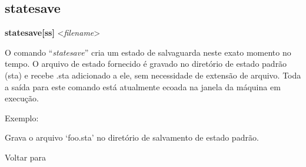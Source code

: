 \documentclass[letterpaper,10pt,brazil]{sphinxmanual}
\begin{document}
\subsection{statesave}
\label{debugger/general:debugger-command-statesave}\label{debugger/general:statesave}
\begin{DUlineblock}{0em}
\item[]
\begin{DUlineblock}{\DUlineblockindent}
\item[] \textbf{statesave{[}ss{]}} \textless{}\emph{filename}\textgreater{}
\item[] 
\end{DUlineblock}
\item[] O comando ``\emph{statesave}'' cria um estado de salvaguarda neste exato momento no tempo. O arquivo de estado fornecido é gravado no diretório de estado padrão (sta) e recebe .sta adicionado a ele, sem necessidade de extensão de arquivo. Toda a saída para este comando está atualmente ecoada na janela da máquina em execução.
\item[] 
\item[] Exemplo:
\item[] 
\item[]
\begin{DUlineblock}{\DUlineblockindent}
\item[] 
\item[] 
\end{DUlineblock}
\item[] Grava o arquivo `foo.sta' no diretório de salvamento de estado padrão.
\item[] 
\item[] Voltar para {\hyperref[debugger/general:debugger\string-general\string-list]{}}
\end{DUlineblock}
\begin{quote}
\label{debugger/general:debugger-command-stateload}\end{quote}
\end{document}
